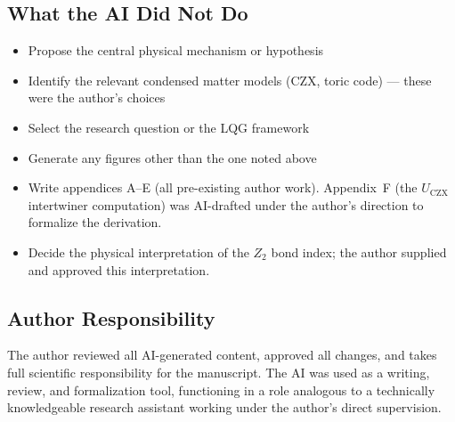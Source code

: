 \documentclass[preprint]{SciPost}
\theoremstyle{plain} %
\begin{document}
\subsection*{What the AI Did Not Do}

\begin{itemize}
\item Propose the central physical mechanism or hypothesis
\item Identify the relevant condensed matter models (CZX, toric code) --- these were the author's choices
\item Select the research question or the LQG framework
\item Generate any figures other than the one noted above
\item Write appendices A--E (all pre-existing author work). Appendix~F (the $U_{\mathrm{CZX}}$ intertwiner computation) was AI-drafted under the author's direction to formalize the derivation.
\item Decide the physical interpretation of the $Z_2$ bond index; the author supplied and approved this interpretation.
\end{itemize}

\subsection*{Author Responsibility}

The author reviewed all AI-generated content, approved all changes, and takes full scientific responsibility for the manuscript. The AI was used as a writing, review, and formalization tool, functioning in a role analogous to a technically knowledgeable research assistant working under the author's direct supervision.
\end{document}
